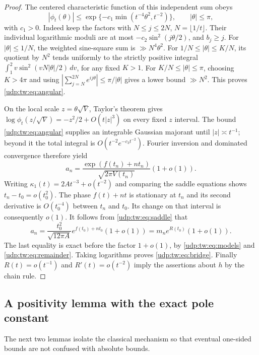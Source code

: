 \documentclass[11pt]{article}
\theoremstyle{remark}\newtheorem{remark}[theorem]{Remark}
\numberwithin{equation}{section}
\begin{document}
\begin{proof}
The centered characteristic function of this independent sum obeys
\begin{equation}
 |\phi_t(\theta)|
 \le\exp\{-c_1\min(t^{-4}\theta^2,t^{-2})\},
 \qquad |\theta|\le\pi,\label{udp:tw:eq:angular}
\end{equation}
with $c_1>0$. Indeed keep the factors with
$N\le j\le2N$, $N=\lfloor1/t\rfloor$.
Their individual logarithmic moduli are at most
$-c_2\sin^2(j\theta/2)$, and $b_j\ge j$.
For $|\theta|\le1/N$, the weighted sine-square sum is
$\gg N^4\theta^2$.
For $1/N\le|\theta|\le K/N$, its quotient by $N^2$ tends uniformly to
the strictly positive integral
$\int_1^2v\sin^2(vN|\theta|/2)\,dv$, for any fixed $K>1$.
For $K/N\le|\theta|\le\pi$, choosing $K>4\pi$ and using
$|\sum_{j=N}^{2N}e^{ij\theta}|\le\pi/|\theta|$ gives
a lower bound $\gg N^2$. This proves \eqref{udp:tw:eq:angular}.

On the local scale $z=\theta\sqrt V$, Taylor's theorem gives
$\log\phi_t(z/\sqrt V)=-z^2/2+O(t|z|^3)$ on every fixed $z$ interval.
The bound \eqref{udp:tw:eq:angular} supplies an integrable Gaussian
majorant until $|z|\asymp t^{-1}$; beyond it the total integral is
$O(t^{-2}e^{-c_3t^{-2}})$.
Fourier inversion and dominated convergence therefore yield
\begin{equation}
 a_n=\frac{\exp(f(t_n)+nt_n)}{\sqrt{2\pi V(t_n)}}(1+o(1)).
 \label{udp:tw:eq:saddle}
\end{equation}
Writing $\kappa_1(t)=2At^{-3}+o(t^{-2})$ and comparing the saddle
equations shows $t_n-t_0=o(t_0^2)$.
The phase $f(t)+nt$ is stationary at $t_n$ and its second derivative
is $O(t_0^{-4})$ between $t_n$ and $t_0$.
Its change on that interval is consequently $o(1)$.
It follows from \eqref{udp:tw:eq:saddle} that
\[
 a_n=\frac{t_0^2}{\sqrt{12\pi A}}
       e^{f(t_0)+nt_0}(1+o(1))
     =m_n e^{R(t_0)}(1+o(1)).
\]
The last equality is exact before the factor $1+o(1)$, by
\eqref{udp:tw:eq:models} and \eqref{udp:tw:eq:remainder}.
Taking logarithms proves \eqref{udp:tw:eq:bridge}.
Finally $R(t)=o(t^{-1})$ and $R'(t)=o(t^{-2})$ imply the assertions
about $h$ by the chain rule.
\end{proof}

\subsection{A positivity lemma with the exact pole constant}

The next two lemmas isolate the classical mechanism so that eventual
one-sided bounds are not confused with absolute bounds.
\end{document}
